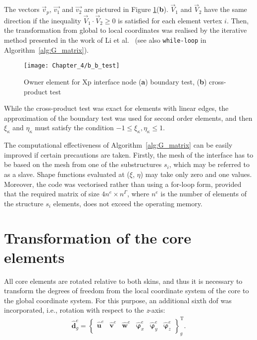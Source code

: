 \documentclass[11pt,a4paper,final]{report}
\theoremstyle{plain}
\begin{document}
The vectors \(\vec{v}_p\), \(\vec{v_1}\) and \(\vec{v_2}\) are pictured in Figure \ref{fig:b_b_test}(\textbf{b}). \(\vec{V}_1\) and \(\vec{V}_2\) have the same direction if the inequality \(\vec{V}_1 \cdot \vec{V}_2 \geq0\) is satisfied for each element vertex \(i\).
Then, the transformation from global to local coordinates was realised by the iterative method presented in the work of Li et al.~\cite{li2014efficient} (see also \verb+while-loop+ in Algorithm~\ref{alg:G_matrix}).
\begin{figure}[H]
	\begin{center}
		\texttt{[image: Chapter\_4/b\_b\_test]}
	\end{center}
	\caption{Owner element for Xp interface node (\textbf{a}) boundary test, (\textbf{b}) cross-product test}
	\label{fig:b_b_test}
\end{figure}
While the cross-product test was exact for elements with linear edges, the approximation of the boundary test was used for second order elements, and then \(\xi_{\kappa}\) and \(\eta_{\kappa}\) must satisfy the condition \(-1\leq \xi_{\kappa},\eta_{\kappa} \leq 1\).

The computational effectiveness of Algorithm~\ref{alg:G_matrix} can be easily improved if certain precautions are taken.
Firstly, the mesh of the interface has to be based on the mesh from one of the substructures \(s_{i}\), which may be referred to as a slave.
Shape functions evaluated at (\(\xi\), \(\eta\)) may take only zero and one values.
Moreover, the code was vectorised rather than using a for-loop form, provided that the required matrix of size \(4n^e\times n^{\Gamma}\), where \(n^e\) is the number of elements of the structure \(s_i\) elements, does not exceed the operating memory. \section{Transformation of the core elements}
\label{sec:transformation}

All core elements are rotated relative to both skins, and thus it is necessary to transform the degrees of freedom from the local coordinate system of the core to the global coordinate system.
For this purpose, an additional sixth \ac{dof} was incorporated, i.e., rotation with respect to the \textit{z}-axis:
\begin{eqnarray}
	\widehat{\textbf{d}}^e_g = \left \{\begin{array}{cccccc}
		\widehat{\textbf{u}}^e & \widehat{\textbf{v}}^e &
		\widehat{\textbf{w}}^e & \widehat{\boldsymbol{\varphi}}_x^e &
		\widehat{\boldsymbol{\varphi}}_y^e & \widehat{\boldsymbol{\varphi}}_z^e
	\end{array}\right \}^{\mathrm{T}}_g.
	\label{eq:d6}
\end{eqnarray}
\end{document}
